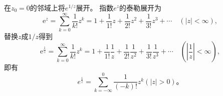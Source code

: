 \begin{examplebox}{在$z_0 = 0$的邻域上将$e^{1/z}$展开。}
指数$e^z$的泰勒展开为
\[
    \mathrm{e}^z=\sum_{k=0}^{\infty} \frac{1}{k !} z^k=1+\frac{1}{1 !} z+\frac{1}{2 !} z^2+\frac{1}{3 !} z^3+\cdots \quad(|z|<\infty),    
\]
替换$z$成$1/z$得到
\[
    \mathrm{e}^{\frac{1}{z}}=\sum_{k=0}^{\infty} \frac{1}{k !} z^k=1+\frac{1}{1 !} \frac{1}{z}+\frac{1}{2 !} \frac{1}{z^2}+\frac{1}{3 !} \frac{1}{z^3}+\cdots \quad(|\frac{1}{z}|<\infty),    
\]
即有
\[
e^{\frac{1}{z}} = \sum_{k=-\infty}^{0} \frac{1}{(-k)!} z^k ( |z| > 0) \textrm{。}
\]
\end{examplebox}